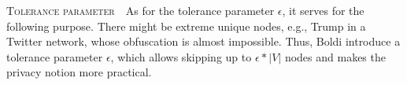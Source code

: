 \textsc{Tolerance parameter}~~As for the tolerance parameter $\epsilon$, it serves for the following purpose. There might be extreme unique nodes, e.g., Trump in a Twitter network, whose obfuscation is almost impossible. Thus, Boldi {\etal} introduce a tolerance parameter $\epsilon$, which allows skipping up to $\epsilon * |V|$ nodes and makes the privacy notion more practical. 
